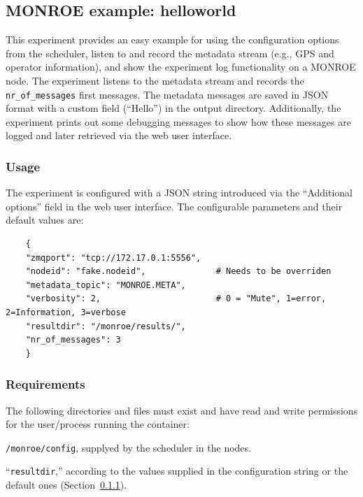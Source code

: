 \documentclass[a4paper,10pt]{article}
\newcommand{\VerbatimFont}{\footnotesize}
\newcommand{\monroe}{MONROE}
\newcommand{\identifier}[1]{{\texttt{\small{#1}}}}
\begin{document}
\subsection{\monroe{} example: helloworld}

This experiment provides an easy example for using the configuration options from the scheduler, listen to and record the metadata stream (e.g., GPS and operator information), and show the experiment log functionality on a \monroe{} node.
The experiment listens to the metadata stream and records the \identifier{nr\_of\_messages} first messages.
The metadata messages are saved in JSON format with a custom field (``Hello'') in the output directory.
Additionally, the experiment prints out some debugging messages to show how these messages are logged and later retrieved via the web user interface.

\subsubsection{Usage}
\label{subsubsec:helloworldUsage}

The experiment is configured with a JSON string introduced via the ``Additional options'' field in the web user interface.
The configurable parameters and their default values are:

{\VerbatimFont
	\begin{verbatim}
	{
	"zmqport": "tcp://172.17.0.1:5556",
	"nodeid": "fake.nodeid",              # Needs to be overriden
	"metadata_topic": "MONROE.META",
	"verbosity": 2,                       # 0 = "Mute", 1=error, 2=Information, 3=verbose
	"resultdir": "/monroe/results/",
	"nr_of_messages": 3
	}
	\end{verbatim}}

\subsubsection{Requirements}

The following directories and files must exist and have read and write permissions for the user/process running the container:

\begin{itemize*}
	\item \identifier{/monroe/config}, supplyed by the scheduler in the nodes.
	\item ``\identifier{resultdir},'' according to the values supplied in the configuration string or the default ones (Section~\ref{subsubsec:helloworldUsage}).
\end{itemize*}
\end{document}
